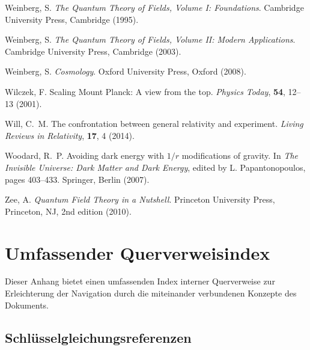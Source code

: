 \documentclass[12pt,a4paper]{article}
\begin{document}
\begin{thebibliography}{99}
		Weinberg, S.
		\newblock \textit{The Quantum Theory of Fields, Volume I: Foundations}.
		\newblock Cambridge University Press, Cambridge (1995).
		
		Weinberg, S.
		\newblock \textit{The Quantum Theory of Fields, Volume II: Modern Applications}.
		\newblock Cambridge University Press, Cambridge (2003).
		
		Weinberg, S.
		\newblock \textit{Cosmology}.
		\newblock Oxford University Press, Oxford (2008).
		
		Wilczek, F.
		\newblock Scaling Mount Planck: A view from the top.
		\newblock \textit{Physics Today}, \textbf{54}, 12--13 (2001).
		\newblock {}
		
		Will, C.~M.
		\newblock The confrontation between general relativity and experiment.
		\newblock \textit{Living Reviews in Relativity}, \textbf{17}, 4 (2014).
		\newblock {}
		
		Woodard, R.~P.
		\newblock Avoiding dark energy with $1/r$ modifications of gravity.
		\newblock In \textit{The Invisible Universe: Dark Matter and Dark Energy}, edited by L. Papantonopoulos, pages 403--433. Springer, Berlin (2007).
		\newblock {}
		
		Zee, A.
		\newblock \textit{Quantum Field Theory in a Nutshell}.
		\newblock Princeton University Press, Princeton, NJ, 2nd edition (2010).
		
	\end{thebibliography}
	
	\appendix
	
	\section{Umfassender Querverweisindex}
	\label{app:cross_references}
	
	Dieser Anhang bietet einen umfassenden Index interner Querverweise zur Erleichterung der Navigation durch die miteinander verbundenen Konzepte des Dokuments.
	
	\subsection{Schlüsselgleichungsreferenzen}
	\label{app:key_equations}
	
\end{document}
